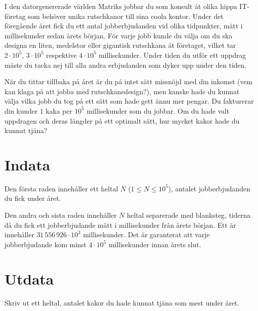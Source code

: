 I den datorgenererade världen Matriks jobbar du som konsult åt olika hippa IT-företag som behöver unika rutschkanor till sina coola kontor.
Under det föregående året fick du ett antal jobberbjudanden vid olika tidpunkter, mätt i millisekunder sedan årets början.
För varje jobb kunde du välja om du ska designa en liten, medelstor eller gigantisk rutschkana åt företaget, vilket tar $2 \cdot 10^5$, $3 \cdot 10^5$ respektive $4 \cdot 10^5$ millisekunder.
Under tiden du utför ett uppdrag måste du tacka nej till alla andra erbjudanden som dyker upp under den tiden.

När du tittar tillbaka på året är du på intet sätt missnöjd med din inkomst (vem kan klaga på att jobba med rutschkanedesign?), men kanske hade du kunnat välja vilka jobb du tog på ett sätt som hade gett ännu mer pengar.
Du fakturerar din kunder $1$ kaka per $10^5$ millisekunder som du jobbar.
Om du hade valt uppdragen och deras längder på ett optimalt sätt, hur mycket kakor hade du kunnat tjäna?


\section*{Indata}
Den första raden innehåller ett heltal $N$ ($1 \le N \le 10^5$), antalet jobberbjudanden du fick under året.

Den andra och sista raden innehåller $N$ heltal separerade med blanksteg, tiderna då du fick ett jobberbjudande mätt i millisekunder från årets början.
Ett år innehåller $31\,556\,926 \cdot 10^3$ millisekunder.
Det är garanterat att varje jobberbjudande kom minst $4 \cdot 10^5$ millisekunder innan årets slut.

\section*{Utdata}
Skriv ut ett heltal, antalet kakor du hade kunnat tjäna som mest under året.
